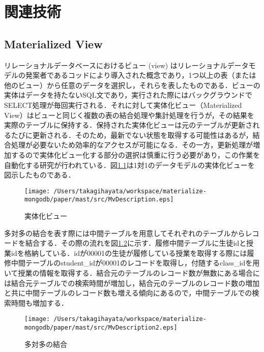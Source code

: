 \documentclass[a4paper,11pt]{ujreport}
\begin{document}
\chapter{関連技術}
\label{chap:LiteratureReview}
\section{Materialized View}
リレーショナルデータベースにおけるビュー (view) はリレーショナルデータモデルの発案者であるコッドにより導入された概念であり\cite{Codd1974RecentII}，1つ以上の表（または他のビュー）から任意のデータを選択し，それらを表したものである．ビューの実体はデータを持たないSQL文であり，実行された際にはバックグラウンドでSELECT処理が毎回実行される．それに対して実体化ビュー（Materialized View）はビューと同じく複数の表の結合処理や集計処理を行うが，その結果を実際のテーブルに保持する．保持された実体化ビューは元のテーブルが更新されるたびに更新される．そのため，最新でない状態を取得する可能性はあるが，結合処理が必要ないため効率的なアクセスが可能になる．その一方，更新処理が増加するので実体化ビュー化する部分の選択は慎重に行う必要があり，この作業を自動化する研究が行われている\cite{mistry2001materialized}．図\ref{figure:MvDescription}は1対1のデータモデルの実体化ビューを図示したものである．
\begin{figure}[htbp]
	\begin{center}
		\texttt{[image: /Users/takagihayata/workspace/materialize-mongodb/paper/mast/src/MvDescription.eps]} %
	\end{center}
	\caption{実体化ビュー}
	\label{figure:MvDescription}
\end{figure}


多対多の結合を表す際には中間テーブルを用意してそれぞれのテーブルからレコードを結合する．その際の流れを図\ref{figure:MvDescription2}に示す．履修中間テーブルに生徒idと授業idを格納している．idが00001の生徒が履修している授業を取得する際には履修中間テーブルのstudent\_idが00001のレコードを取得し，付随するclass\_idを用いて授業の情報を取得する．結合元のテーブルのレコード数が無数にある場合には結合元テーブルでの検索時間が増加し，結合元のテーブルのレコード数の増加と共に中間テーブルのレコード数も増える傾向にあるので，中間テーブルでの検索時間も増加する．
\begin{figure}[htbp]
	\begin{center}
		\texttt{[image: /Users/takagihayata/workspace/materialize-mongodb/paper/mast/src/MvDescription2.eps]} %
	\end{center}
	\caption{多対多の結合}
	\label{figure:MvDescription2}
\end{figure}
\end{document}
